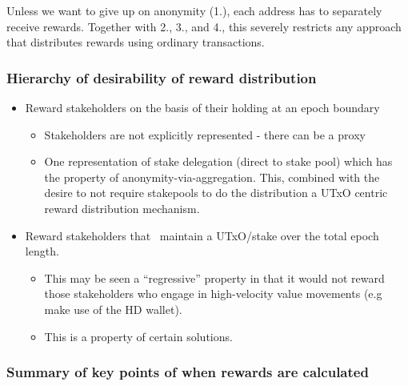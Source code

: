\documentclass[11pt,a4paper]{article}
\begin{document}
Unless we want to give up on anonymity (1.), each address has to
separately receive rewards. Together with 2., 3., and 4., this severely
restricts any approach that distributes rewards using ordinary
transactions.

\subsubsection{Hierarchy of desirability of reward distribution}
\label{hierarchy-of-desirability-of-reward-distribution}

\begin{itemize}
\item
  Reward stakeholders on the basis of their holding at an epoch boundary

  \begin{itemize}
  \item
    Stakeholders are not explicitly represented - there can be a proxy
  \item
    One representation of stake delegation (direct to stake pool) which
    has the property of anonymity-via-aggregation. This, combined with
    the desire to not require stakepools to do the distribution a UTxO
    centric reward distribution mechanism.
  \end{itemize}
\item
  Reward stakeholders that ~maintain a UTxO/stake over the total epoch
  length.

  \begin{itemize}
  \item
    This may be seen a ``regressive'' property in that it would not
    reward those stakeholders who engage in high-velocity value
    movements (e.g make use of the HD wallet).
  \item
    This is a property of certain solutions.
  \end{itemize}
\end{itemize}

\subsubsection{Summary of key points of when rewards are calculated}
\label{summary-of-key-points-of-when-rewards-are-calculated}
\end{document}
